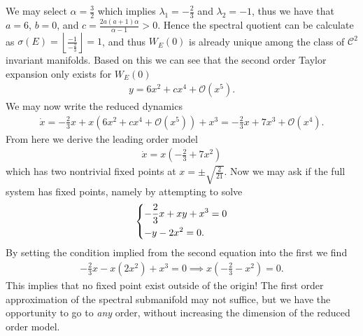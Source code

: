 \begin{ex}[]
We may select $\alpha =\frac{3}{2}$ which implies $\lambda_1 = -\frac{2}{3}$ and $\lambda _2 = -1$, thus we have that $a=6$, $b=0$, and $c= \frac{2a(a+1)\alpha }{\alpha -1}>0$. Hence the spectral quotient can be calculate as $\sigma(E) = \left\lfloor \frac{-1}{-\frac{2}{3}}\right\rfloor = 1$, and thus $W_E(0)$ is already unique among the class of $\mathcal{C}^{2}$ invariant manifolds. Based on this we can see that the second order Taylor expansion only exists for $W_E(0)$ 
\begin{align}
	y = 6x^2 + cx^4 + \mathcal{O}(x^5).
\end{align}
We may now write the reduced dynamics
\begin{align}
	\dot{x} = - \frac{2}{3} x + x(6x^2+cx^4 + \mathcal{O}(x^5)) + x^3 = -\frac{2}{3}x + 7x^3 + \mathcal{O}(x^4).
\end{align}
From here we derive the leading order model
\begin{align}
	\dot{x} = x\left( -\frac{2}{3} + 7x^2\right)
\end{align}
which has two nontrivial fixed points at $x = \pm \sqrt{\frac{2}{21}}$. Now we may ask if the full system has fixed points, namely by attempting to solve
\begin{align}
	\begin{dcases}
		-\frac{2}{3} x + xy + x^3 = 0\\
		-y - 2x^2 = 0.
	\end{dcases}
\end{align}
By setting the condition implied from the second equation into the first we find
\begin{align}
	-\frac{2}{3}x - x(2x^2) + x^3 = 0 \implies x\left(-\frac{2}{3} - x^2 \right) =0. 
\end{align}
This implies that no fixed point exist outside of the origin! The first order approximation of the spectral submanifold may not suffice, but we have the opportunity to go to \emph{any} order, without increasing the dimension of the reduced order model.
\end{ex}

